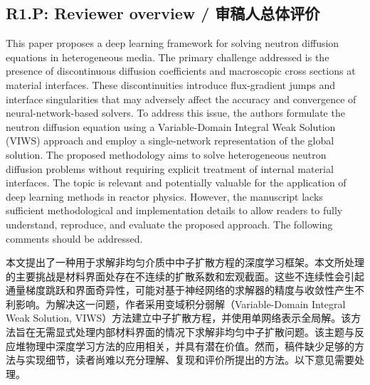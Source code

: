 \documentclass[11pt,a4paper,twoside]{article}
\begin{document}
\subsection{R1.P: Reviewer overview / 审稿人总体评价}
\begin{englishcomment}
This paper proposes a deep learning framework for solving neutron diffusion equations in heterogeneous media. The primary challenge addressed is the presence of discontinuous diffusion coefficients and macroscopic cross sections at material interfaces. These discontinuities introduce flux-gradient jumps and interface singularities that may adversely affect the accuracy and convergence of neural-network-based solvers. To address this issue, the authors formulate the neutron diffusion equation using a Variable-Domain Integral Weak Solution (VIWS) approach and employ a single-network representation of the global solution. The proposed methodology aims to solve heterogeneous neutron diffusion problems without requiring explicit treatment of internal material interfaces. The topic is relevant and potentially valuable for the application of deep learning methods in reactor physics. However, the manuscript lacks sufficient methodological and implementation details to allow readers to fully understand, reproduce, and evaluate the proposed approach. The following comments should be addressed.
\end{englishcomment}
\begin{chinesecomment}
本文提出了一种用于求解非均匀介质中中子扩散方程的深度学习框架。本文所处理的主要挑战是材料界面处存在不连续的扩散系数和宏观截面。这些不连续性会引起通量梯度跳跃和界面奇异性，可能对基于神经网络的求解器的精度与收敛性产生不利影响。为解决这一问题，作者采用变域积分弱解（Variable-Domain Integral Weak Solution, VIWS）方法建立中子扩散方程，并使用单网络表示全局解。该方法旨在无需显式处理内部材料界面的情况下求解非均匀中子扩散问题。该主题与反应堆物理中深度学习方法的应用相关，并具有潜在价值。然而，稿件缺少足够的方法与实现细节，读者尚难以充分理解、复现和评价所提出的方法。以下意见需要处理。
\end{chinesecomment}
\begin{revisionidea}
\end{revisionidea}

\end{document}
